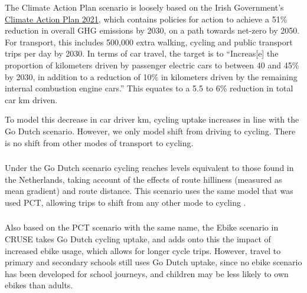 \documentclass[
  super,
  preprint,
  3p]{elsarticle}
\providecommand{\DIFadd}[1]{{\protect\color{blue}\uwave{#1}}} %
\providecommand{\DIFaddbegin}{} %
\providecommand{\DIFaddend}{} %
\providecommand{\DIFdelbegin}{} %
\providecommand{\DIFdelend}{} %
\newcommand{\DIFscaledelfig}{0.5}
\newlength{\DIFdelgraphicswidth} %
\newlength{\DIFdelgraphicsheight} %
\newcommand{\DIFaddincludegraphics}[2][]{{\color{blue}\fbox{\DIFOincludegraphics[#1]{#2}}}} %
\newcommand{\DIFdelincludegraphics}[2][]{%
\sbox{\DIFdelgraphicsbox}{\DIFOincludegraphics[#1]{#2}}%
\settoboxwidth{\DIFdelgraphicswidth}{\DIFdelgraphicsbox} %
\settoboxtotalheight{\DIFdelgraphicsheight}{\DIFdelgraphicsbox} %
\scalebox{\DIFscaledelfig}{%
\parbox[b]{\DIFdelgraphicswidth}{\usebox{\DIFdelgraphicsbox}\\[-\baselineskip] \rule{\DIFdelgraphicswidth}{0em}}\llap{\resizebox{\DIFdelgraphicswidth}{\DIFdelgraphicsheight}{%
\setlength{\unitlength}{\DIFdelgraphicswidth}%
\begin{picture}(1,1)%
\thicklines\linethickness{2pt} %
{\color[rgb]{1,0,0}\put(0,0){\framebox(1,1){}}}%
{\color[rgb]{1,0,0}\put(0,0){\line( 1,1){1}}}%
{\color[rgb]{1,0,0}\put(0,1){\line(1,-1){1}}}%
\end{picture}%
}\hspace*{3pt}}} %
} %
\DeclareRobustCommand{\DIFaddbegin}{\DIFOaddbegin \let\includegraphics\DIFaddincludegraphics} %
\DeclareRobustCommand{\DIFaddend}{\DIFOaddend \let\includegraphics\DIFOincludegraphics} %
\DeclareRobustCommand{\DIFdelbegin}{\DIFOdelbegin \let\includegraphics\DIFdelincludegraphics} %
\DeclareRobustCommand{\DIFdelend}{\DIFOaddend \let\includegraphics\DIFOincludegraphics} %
\begin{document}
The Climate Action Plan scenario is loosely based on the Irish
Government's
\href{https://www.gov.ie/en/publication/6223e-climate-action-plan-2021/}{Climate
Action Plan 2021}, which contains policies for action to achieve a 51\%
reduction in overall GHG emissions by 2030, on a path towards net-zero
by 2050. For transport, this includes 500,000 extra walking, cycling and
public transport trips per day by 2030. In terms of car travel, the
target is to ``Increas{[}e{]} the proportion of kilometers driven by
passenger electric cars to between 40 and 45\% by 2030, in addition to a
reduction of 10\% in kilometers driven by the remaining internal
combustion engine cars.'' This equates to a 5.5 to 6\% reduction in
total car km driven.

To model this decrease in car driver km, cycling uptake increases in
line with the Go Dutch scenario. However, we only model shift from
driving to cycling. There is no shift from other modes of transport to
cycling.

\DIFdelbegin %
\DIFdelend \DIFaddbegin \subsubsection{\DIFadd{Go Dutch}}\label{go-dutch}
\DIFaddend 

Under the Go Dutch scenario cycling reaches levels equivalent to those
found in the Netherlands, taking account of the effects of route
hilliness (measured as mean gradient) and route distance. This scenario
uses the same model that was used PCT, allowing trips to shift from any
other mode to cycling \citep{lovelace2017}.

\DIFdelbegin %
\DIFdelend \DIFaddbegin \subsubsection{\DIFadd{Ebike}}\label{ebike}
\DIFaddend 

Also based on the PCT scenario with the same name, the Ebike scenario in
CRUSE takes Go Dutch cycling uptake, and adds onto this the impact of
increased ebike usage, which allows for longer cycle trips. However,
travel to primary and secondary schools still uses Go Dutch uptake,
since no ebike scenario has been developed for school journeys, and
children may be less likely to own ebikes than adults.
\end{document}
